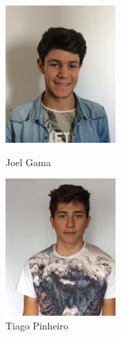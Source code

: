 \documentclass{llncs}
\begin{document}
\begin{figure}[!htb]
  \includegraphics[width=\linewidth]{a82202.jpg}
  \caption{Joel Gama}\label{fig:a82202}
\endminipage\hfill
{}%
  \includegraphics[width=\linewidth]{a82491.jpg}
  \caption{Tiago Pinheiro}\label{fig:a82491}
\endminipage
\end{figure}
\end{document}
